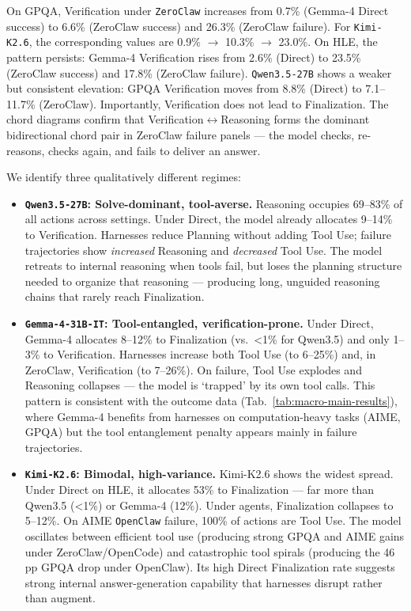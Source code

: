 On GPQA, Verification under \texttt{ZeroClaw} increases from 0.7\% (Gemma-4 Direct success) to 6.6\% (ZeroClaw success) and 26.3\% (ZeroClaw failure). For \texttt{Kimi-K2.6}, the corresponding values are 0.9\% \(\rightarrow\) 10.3\% \(\rightarrow\) 23.0\%. On HLE, the pattern persists: Gemma-4 Verification rises from 2.6\% (Direct) to 23.5\% (ZeroClaw success) and 17.8\% (ZeroClaw failure).
\texttt{Qwen3.5-27B} shows a weaker but consistent elevation: GPQA Verification moves from 8.8\% (Direct) to 7.1--11.7\% (ZeroClaw).
%
Importantly, Verification does not lead to Finalization. The chord diagrams confirm that Verification\(\leftrightarrow\)Reasoning forms the dominant bidirectional chord pair in ZeroClaw failure panels — the model checks, re-reasons, checks again, and fails to deliver an answer.


We identify three qualitatively different regimes:
\begin{itemize}[leftmargin=*, itemsep=0pt, topsep=0.5pt]
    \item \textbf{\texttt{Qwen3.5-27B}: Solve-dominant, tool-averse.}
    Reasoning occupies 69--83\% of all actions across settings. Under Direct, the model already allocates 9--14\% to Verification. Harnesses reduce Planning without adding Tool Use; failure trajectories show \emph{increased} Reasoning and \emph{decreased} Tool Use. The model retreats to internal reasoning when tools fail, but loses the planning structure needed to organize that reasoning — producing long, unguided reasoning chains that rarely reach Finalization.

    \item \textbf{\texttt{Gemma-4-31B-IT}: Tool-entangled, verification-prone.}
    Under Direct, Gemma-4 allocates 8--12\% to Finalization (vs.\ <1\% for Qwen3.5) and only 1--3\% to Verification. Harnesses increase both Tool Use (to 6--25\%) and, in ZeroClaw, Verification (to 7--26\%). On failure, Tool Use explodes and Reasoning collapses — the model is `trapped' by its own tool calls. This pattern is consistent with the outcome data (Tab.~\ref{tab:macro-main-results}), where Gemma-4 benefits from harnesses on computation-heavy tasks (AIME, GPQA) but the tool entanglement penalty appears mainly in failure trajectories.

    \item \textbf{\texttt{Kimi-K2.6}: Bimodal, high-variance.}
    Kimi-K2.6 shows the widest spread. Under Direct on HLE, it allocates 53\% to Finalization — far more than Qwen3.5 (<1\%) or Gemma-4 (12\%). Under agents, Finalization collapses to 5--12\%. On AIME \texttt{OpenClaw} failure, 100\% of actions are Tool Use. The model oscillates between efficient tool use (producing strong GPQA and AIME gains under ZeroClaw/OpenCode) and catastrophic tool spirals (producing the 46 pp GPQA drop under OpenClaw). Its high Direct Finalization rate suggests strong internal answer-generation capability that harnesses disrupt rather than augment.
\end{itemize}
